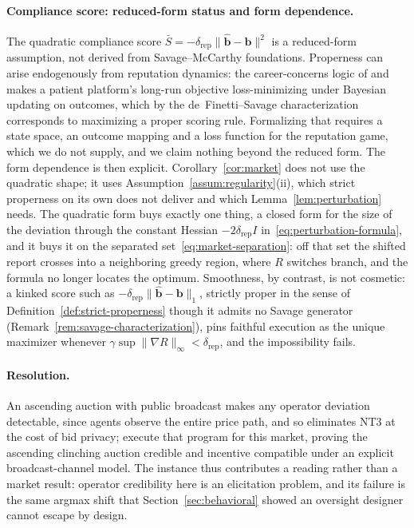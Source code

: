 \documentclass[acmsmall,nonacm,screen]{acmart}
\theoremstyle{acmplain}%
\theoremstyle{acmdefinition}%
\newcommand{\Sbar}{\bar{S}}
\numberwithin{equation}{section}
\begin{document}
\paragraph{Compliance score: reduced-form status and form dependence.}
The quadratic compliance score $\Sbar = -\delta_{\mathrm{rep}}\|\hat{\mathbf{b}} - \mathbf{b}\|^2$ is a reduced-form assumption, not derived from Savage--McCarthy foundations. Properness can arise endogenously from reputation dynamics: the career-concerns logic of \citet{holmstrom1999managerial} and \citet{mailath2001pays} makes a patient platform's long-run objective loss-minimizing under Bayesian updating on outcomes, which by the de~Finetti--Savage characterization \citep{definetti1937prevision, savage1971elicitation} corresponds to maximizing a proper scoring rule. Formalizing that requires a state space, an outcome mapping and a loss function for the reputation game, which we do not supply, and we claim nothing beyond the reduced form. The form dependence is then explicit. Corollary~\ref{cor:market} does not use the quadratic shape; it uses Assumption~\ref{assum:regularity}(ii), which strict properness on its own does not deliver and which Lemma~\ref{lem:perturbation} needs. The quadratic form buys exactly one thing, a closed form for the size of the deviation through the constant Hessian $-2\delta_{\mathrm{rep}} I$ in~\eqref{eq:perturbation-formula}, and it buys it on the separated set~\eqref{eq:market-separation}: off that set the shifted report crosses into a neighboring greedy region, where $R$ switches branch, and the formula no longer locates the optimum. Smoothness, by contrast, is not cosmetic: a kinked score such as $-\delta_{\mathrm{rep}}\|\hat{\mathbf{b}} - \mathbf{b}\|_1$, strictly proper in the sense of Definition~\ref{def:strict-properness} though it admits no Savage generator (Remark~\ref{rem:savage-characterization}), pins faithful execution as the unique maximizer whenever $\gamma \sup \|\nabla R\|_\infty < \delta_{\mathrm{rep}}$, and the impossibility fails.

\paragraph{Resolution.} An ascending auction with public broadcast makes any operator deviation detectable, since agents observe the entire price path, and so eliminates NT3 at the cost of bid privacy; \citet{loven2026trilemma} execute that program for this market, proving the ascending clinching auction credible and incentive compatible under an explicit broadcast-channel model. The instance thus contributes a reading rather than a market result: operator credibility here is an elicitation problem, and its failure is the same argmax shift that Section~\ref{sec:behavioral} showed an oversight designer cannot escape by design.
\end{document}
